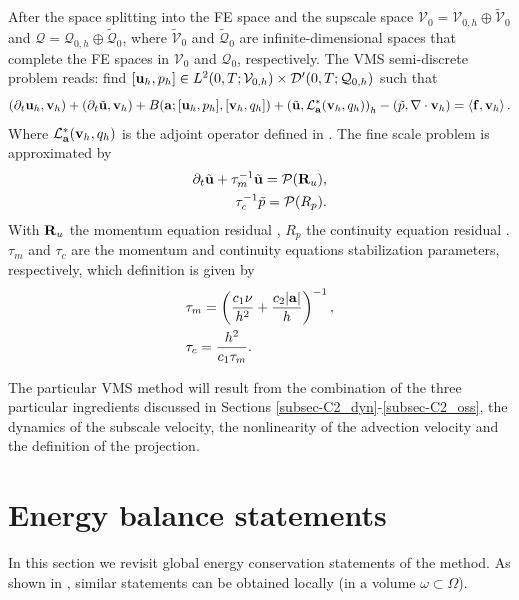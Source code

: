 After the space splitting into the FE space and the supscale space $\mathcal{V}_0=\mathcal{V}_{0,h}\oplus\widetilde{\mathcal{V}}_0$ and $\mathcal{Q}=\mathcal{Q}_{0,h}\oplus\widetilde{\mathcal{Q}}_0$, where $\widetilde{\mathcal{V}}_0$ and $\widetilde{\mathcal{Q}}_0$ are infinite-dimensional spaces that complete the FE spaces in $\mathcal{V}_0$ and $\mathcal{Q}_0$, respectively. The VMS semi-discrete problem reads: find $[{\bf u}_h,p_h]\in {L}^2(0,T;\mathcal{V}_{0,h})\times {\cal D}'(0,T;\mathcal{Q}_{0,h})$ such that
\begin{equation}
\label{eq-C4_NS_discrete}
(\partial_t{\bf u}_h,{\bf v}_h)+(\partial_t\tilde{{\bf u}},{\bf v}_h)+B({\bf a};[{\bf u}_h,p_h],[{\bf v}_h,q_h])+\left(\tilde{{\bf u}},\mathcal{L}_{{\bf a}}^*({\bf v}_h,q_h)\right)_h-\left(\tilde{p},\nabla\cdot{\bf v}_h\right)=\left<{\bf f},{\bf v}_h\right>.
\end{equation}
Where $ \mathcal{L}_{{\bf a}}^*({\bf v}_h,q_h) $ is the adjoint operator defined in . The fine scale problem is approximated by
\begin{align}
\label{eq-C4_velo_sgs}
\partial_t\tilde{{\bf u}}+\tau_m^{-1}\tilde{{\bf u}}=\mathcal{P}({\bf R}_u),\\
\label{eq-C4_press_sgs}
\tau_c^{-1}\tilde{p}=\mathcal{P}(R_p).
\end{align}
With $ {\bf R}_u $ the momentum equation residual , $ R_p $ the continuity equation residual . $ \tau_m $ and $ \tau_c $ are the momentum and continuity equations stabilization parameters, respectively, which definition is given by 
\begin{align}
\label{eq-C4_tau_m}
&\tau_m=\left(\frac{c_1\nu}{h^2}+\frac{c_2|{\bf a}|}{h}\right)^{-1},\\
\label{eq-C4_tau_c}
&\tau_c=\frac{h^2}{c_1\tau_m}.
\end{align}

The particular VMS method will result from the combination of the three particular ingredients discussed in Sections \ref{subsec-C2_dyn}-\ref{subsec-C2_oss}, the dynamics of the subscale velocity, the nonlinearity of the advection velocity and the definition of the projection.

\section{Energy balance statements}
\label{sec-C4_energy}

In this section we revisit global energy conservation statements of the method. As shown in \cite{Principe2009}, similar statements can be obtained locally (in a volume $\omega \subset \Omega$).

